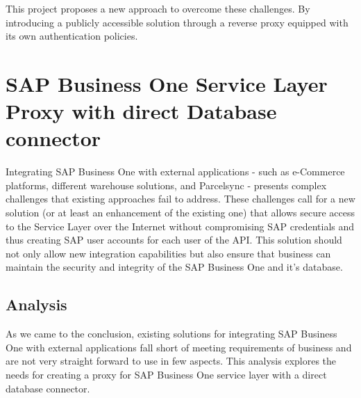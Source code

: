 This project proposes a new approach to overcome these challenges.
By introducing a publicly accessible solution through a reverse proxy equipped with its own authentication policies.

\section{SAP Business One Service Layer Proxy with direct Database connector}
\label{sec:sap-b1-service-layer-proxy}
Integrating SAP Business One with external applications - such as e-Commerce platforms, different warehouse solutions, and Parcelsync - presents complex challenges that existing  approaches fail to address. 
These challenges call for a new solution (or at least an enhancement of the existing one) that allows secure access to the Service Layer over the Internet without compromising SAP credentials and thus creating SAP user accounts for each user of the API.
This solution should not only allow new integration capabilities but also ensure that business can maintain the security and integrity of the SAP Business One and it's database.

\subsection{Analysis}
\label{subsec:analysis}
As we came to the conclusion, existing solutions for integrating SAP Business One with external applications fall short of meeting requirements of business and are not very straight forward to use in few aspects.
This analysis explores the needs for creating a proxy for SAP Business One service layer with a direct database connector.

